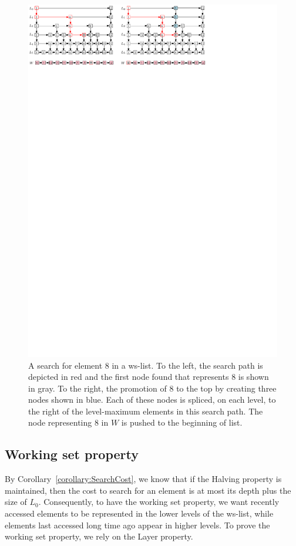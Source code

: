 \documentclass[11pt]{article}       %
\newcommand{\wlist}{ws-list\xspace}
\newcommand{\halving}{Halving property\xspace}
\newcommand{\layer}{Layer property\xspace}
\begin{document}
\begin{figure}[tb]
\centering
\includegraphics[width=1\textwidth]{img/Promotion.pdf}
\caption{\small A search for element $8$ in a \wlist. To the left, the search path is depicted in red and the first node found that represents $8$ is shown in gray. To the right, the promotion of $8$ to the top by creating three nodes shown in blue. Each of these nodes is spliced,  on each level, to the right of the level-maximum elements in this search path. The node representing $8$ in $W$ is pushed to the beginning of list.}
\label{fig:Promotion}
\end{figure}

\subsection{Working set property}

By Corollary~\ref{corollary:SearchCost}, we know that if the \halving is maintained, then the cost to search for an element is at most its depth plus the size of $L_0$. Consequently, to have the working set property, we want recently accessed elements to be represented in the lower levels of the \wlist, while elements last accessed long time ago appear in higher levels. 
To prove the working set property, we rely on the \layer.
\end{document}
